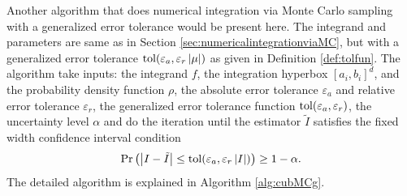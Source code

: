 \documentclass{iitthesis}
\theoremstyle{definition}
\begin{document}
\label{sec:cubmcgalg}

Another algorithm that does numerical integration via Monte Carlo sampling with a generalized error tolerance would be present here. The integrand and parameters are same as in Section \ref{sec:numericalintegrationviaMC}, but with a generalized error tolerance $\operatorname{tol}(\varepsilon_a, \varepsilon_r\left \lvert \mu \right \rvert)$ as given in Definition \ref{def:tolfun}. The algorithm take inputs: the integrand $f$, the integration hyperbox $[a_i,b_i]^d$, and the probability density function $\rho$, the absolute error tolerance $\varepsilon_a$ and relative error tolerance $\varepsilon_r$, the generalized error tolerance function $\operatorname{tol}(\varepsilon_a,\varepsilon_r)$, the uncertainty level $\alpha$ and do the iteration until the estimator $\tilde{I}$ satisfies the fixed width confidence interval condition
\begin{align}\label{cubMCgCI}
\Pr \left(\left \lvert I-\tilde{I} \right \rvert \leq \operatorname{tol}(\varepsilon_a, \varepsilon_r\left \lvert I \right \rvert)\right) \geq 1-\alpha.
\end{align}
The detailed algorithm is explained in Algorithm \ref{alg:cubMCg}.
\end{document}
